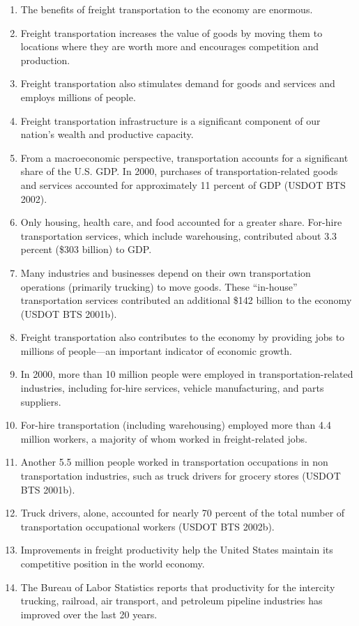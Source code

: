 \documentclass[
]{book}
\begin{document}
\begin{enumerate}
\def\labelenumi{\arabic{enumi})}
\item
  The benefits of freight transportation to the economy are enormous.
\item
  Freight transportation increases the value of goods by moving them to locations where they are worth more and encourages competition and production.
\item
  Freight transportation also stimulates demand for goods and services and employs millions of people.
\item
  Freight transportation infrastructure is a significant component of our nation's wealth and productive capacity.
\item
  From a macroeconomic perspective, transportation accounts for a significant share of the U.S. GDP. In 2000, purchases of transportation-related goods and services accounted for approximately 11 percent of GDP (USDOT BTS 2002).
\item
  Only housing, health care, and food accounted for a greater share. For-hire transportation services, which include warehousing, contributed about 3.3 percent (\$303 billion) to GDP.
\item
  Many industries and businesses depend on their own transportation operations (primarily trucking) to move goods. These ``in-house'' transportation services contributed an additional \$142 billion to the economy (USDOT BTS 2001b).
\item
  Freight transportation also contributes to the economy by providing jobs to millions of people---an important indicator of economic growth.
\item
  In 2000, more than 10 million people were employed in transportation-related industries, including for-hire services, vehicle manufacturing, and parts suppliers.
\item
  For-hire transportation (including warehousing) employed more than 4.4 million workers, a majority of whom worked in freight-related jobs.
\item
  Another 5.5 million people worked in transportation occupations in non transportation industries, such as truck drivers for grocery stores (USDOT BTS 2001b).
\item
  Truck drivers, alone, accounted for nearly 70 percent of the total number of transportation occupational workers (USDOT BTS 2002b).
\item
  Improvements in freight productivity help the United States maintain its competitive position in the world economy.
\item
  The Bureau of Labor Statistics reports that productivity for the intercity trucking, railroad, air transport, and petroleum pipeline industries has improved over the last 20 years.
\end{enumerate}
\end{document}
